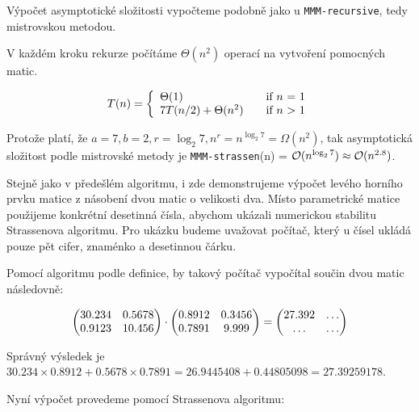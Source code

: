 Výpočet asymptotické složitosti vypočteme podobně jako u \texttt{MMM-recursive}, tedy mistrovskou metodou. 

V každém kroku rekurze počítáme $\Theta(n^2)$ operací na vytvoření pomocných matic.

\[ T(n) = \left\{ 
  \begin{array}{l l}
    \Theta(1) & \quad \text{if $n$ = 1}\\
    7T(n/2) + \Theta(n^2) & \quad \text{if $n$ > 1}
  \end{array} \right.\]

Protože platí, že $a=7, b=2, r=\log_{2} 7, n^r=n^{\log_{2} 7}=\Omega(n^2)$, tak asymptotická složitost podle mistrovské metody je \texttt{MMM-strassen}(n) = $\mathcal{O}(n^{\log_{2} 7}) \approx \mathcal{O}(n^{2.8})$.

Stejně jako v předešlém algoritmu, i zde demonstrujeme výpočet levého horního prvku matice z násobení dvou matic o velikosti dva. Místo parametrické matice použijeme konkrétní desetinná čísla, abychom ukázali numerickou stabilitu Strassenova algoritmu. Pro ukázku budeme uvažovat počítač, který u čísel ukládá pouze pět cifer, znaménko a desetinnou čárku.	

Pomocí algoritmu podle definice, by takový počítač vypočítal součin dvou matic následovně:

\begin{align}
\begin{pmatrix}
 30.234 & 0.5678 \\
 0.9123 & 10.456
\end{pmatrix} \cdot \begin{pmatrix}
 0.8912 & 0.3456 \\
 0.7891 & 9.999 \\
\end{pmatrix} = \begin{pmatrix}
 27.392 & \hdots \\
 \hdots & \hdots
\end{pmatrix} \notag
\end{align}

Správný výsledek je $30.234 \times 0.8912 + 0.5678 \times 0.7891 = 26.9445408 + 0.44805098 = 27.39259178$.

Nyní výpočet provedeme pomocí Strassenova algoritmu:

